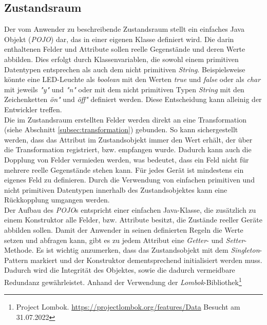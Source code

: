 \subsection{Zustandsraum}
\label{subsec:zustandsraum}
    Der vom Anwender zu beschreibende Zustandsraum stellt ein einfaches Java Objekt (\textit{\acs{POJO}}) dar, das in einer eigenen Klasse definiert wird. 
    Die darin enthaltenen Felder und Attribute sollen reelle Gegenstände und deren Werte abbilden. Dies erfolgt durch 
    Klassenvariablen, die sowohl einem primitiven Datentypen entsprechen als auch dem nicht primitiven \textit{String}. Beispielsweise könnte eine LED-Leuchte als \textit{boolean} mit den 
    Werten \textit{true} und \textit{false} oder als \textit{char} mit jeweils \textit{"y"} und \textit{"n"} oder mit dem nicht primitiven 
    Typen \textit{String} mit den Zeichenketten \textit{\"on"} und \textit{\"off"} definiert 
    werden. Diese Entscheidung kann alleinig der Entwickler treffen. 
    \\
    \linebreak
    Die im Zustandsraum erstellten Felder werden direkt an eine Transformation (siehe Abschnitt \ref{subsec:transformation}) gebunden. So kann sichergestellt werden, dass 
    das Attribut im Zustandsobjekt immer den Wert erhält, der über die Transformation registriert, bzw. empfangen wurde. Dadurch kann 
    auch die Dopplung von Felder vermieden werden, was bedeutet, dass ein Feld nicht für mehrere reelle Gegenstände stehen kann. Für jedes 
    Gerät ist mindestens ein eigenes Feld zu definieren. Durch die Verwendung von einfachen primitiven und nicht primitiven Datentypen innerhalb 
    des Zustandsobjektes kann eine Rückkopplung umgangen werden. 
    \\
    \linebreak
    Der Aufbau des \textit{\acs{POJO}}s entspricht einer einfachen Java-Klasse, die zusätzlich zu einem Konstruktor alle Felder, bzw. Attribute besitzt, die Zustände reeller 
    Geräte abbilden sollen. Damit der Anwender in seinen definierten Regeln die Werte setzen und abfragen kann, gibt es zu jedem Attribut eine \textit{Getter}- und \textit{Setter}-Methode.
    Es ist wichtig anzumerken, dass das Zustandsobjekt mit dem \textit{Singleton}-Pattern markiert und der Konstruktor dementsprechend initialisiert werden muss. Dadurch wird 
    die Integrität des Objektes, sowie die dadurch vermeidbare Redundanz gewährleistet. Anhand der Verwendung der \textit{Lombok}-Bibliothek\footnote{Project Lombok. \url{https://projectlombok.org/features/Data} Besucht am 31.07.2022} 
